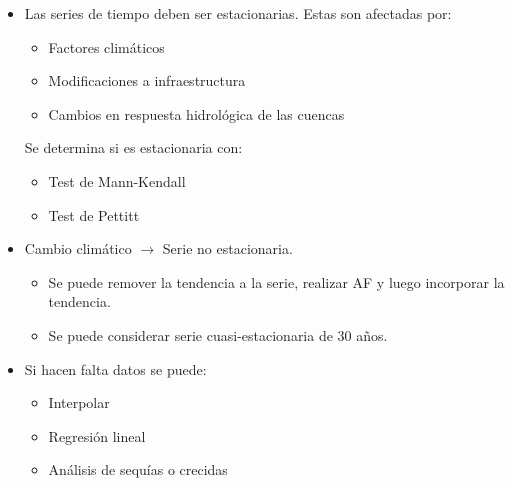 \begin{itemize}
    \item Las series de tiempo deben ser estacionarias. Estas son afectadas por:
    \begin{itemize}
        \item Factores climáticos
        \item Modificaciones a infraestructura
        \item Cambios en respuesta hidrológica de las cuencas
    \end{itemize}
    Se determina si es estacionaria con:
    \begin{itemize}
        \item Test de Mann-Kendall
        \item Test de Pettitt
    \end{itemize}

    \item Cambio climático $\rightarrow$ Serie no estacionaria.
    \begin{itemize}
        \item Se puede remover la tendencia a la serie, realizar AF y luego incorporar la tendencia.
        \item Se puede considerar serie cuasi-estacionaria de 30 años.
    \end{itemize}

    \item Si hacen falta datos se puede:
    \begin{itemize}
        \item Interpolar
        \item Regresión lineal
        \item Análisis de sequías o crecidas 
    \end{itemize}
\end{itemize}

